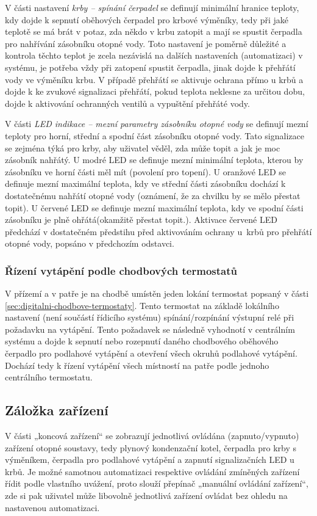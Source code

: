 V části nastavení \textit{krby – spínání čerpadel} se definují minimální hranice teploty, kdy dojde k sepnutí oběhových čerpadel pro krbové výměníky, tedy při jaké teplotě se má brát v potaz, zda někdo v krbu zatopit a mají se spustit čerpadla pro nahřívání zásobníku otopné vody. Toto nastavení je poměrně důležité a kontrola těchto teplot je zcela nezávislá na dalších nastaveních (automatizaci) v systému, je potřeba vždy při zatopení spustit čerpadla, jinak dojde k přehřátí vody ve výměníku krbu. V případě přehřátí se aktivuje ochrana přímo u krbů a dojde k ke zvukové signalizaci přehřátí, pokud teplota neklesne za určitou dobu, dojde k aktivování ochranných ventilů a vypuštění přehřáté vody.


V části \textit{LED indikace – mezní parametry zásobníku otopné vody} se definují mezní teploty pro horní, střední a spodní část zásobníku otopné vody. Tato signalizace se zejména týká pro krby, aby uživatel věděl, zda může topit a jak je moc zásobník nahřátý. U modré LED se definuje mezní minimální teplota, kterou by zásobníku ve horní části měl mít (povolení pro topení). U oranžové LED se definuje mezní maximální teplota, kdy ve střední části zásobníku dochází k dostatečnému nahřátí otopné vody (oznámení, že za chvilku by se mělo přestat topit). U červené LED se definuje mezní maximální teplota, kdy ve spodní části zásobníku je plně ohřátá(okamžitě přestat topit.). Aktivace červené LED předchází v dostatečném předstihu před aktivováním ochrany u~krbů pro přehřátí otopné vody, popsáno v předchozím odstavci.
\subsubsection{Řízení vytápění podle chodbových termostatů}
V přízemí a v patře je na chodbě umístěn jeden lokání termostat popsaný v části \ref{sec:digitalni-chodbove-termostaty}. Tento termostat na základě lokálního nastavení (není součástí řídicího systému) spínání/rozpínání výstupní relé při požadavku na vytápění. Tento požadavek se následně vyhodnotí v centrálním systému a dojde k sepnutí nebo rozepnutí daného chodbového oběhového čerpadlo pro podlahové vytápění a otevření všech okruhů podlahové vytápění. Dochází tedy k řízení vytápění všech místností na patře podle jednoho centrálního termostatu. 

\subsection{Záložka zařízení}
V části „koncová zařízení“ se zobrazují jednotlivá ovládána (zapnuto/vypnuto) zařízení otopné soustavy, tedy plynový kondenzační kotel, čerpadla pro krby s výměníkem, čerpadla pro podlahové vytápění a zapnutí signalizačních LED u krbů. Je možné samotnou automatizaci respektive ovládání zmíněných zařízení řídit podle vlastního uvážení, proto slouží přepínač „manuální ovládání zařízení“, zde si pak uživatel může libovolně jednotlivá zařízení ovládat bez ohledu na nastavenou automatizaci.

